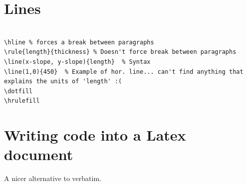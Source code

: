 \documentclass{article}
\begin{document}
\section{Lines}
\begin{lstlisting}

\hline % forces a break between paragraphs
\rule{length}{thickness} % Doesn't force break between paragraphs
\line(x-slope, y-slope){length}  % Syntax
\line(1,0){450}  % Example of hor. line... can't find anything that explains the units of 'length' :(
\dotfill
\hrulefill
\end{lstlisting}



\section{Writing code into a Latex document}
A nicer alternative to verbatim.
\end{document}
